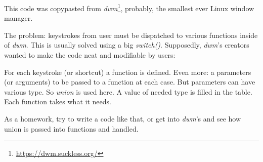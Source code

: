 
This code was copypasted from \emph{dwm}\footnote{\url{https://dwm.suckless.org/}}, probably, the smallest ever Linux window manager.

The problem: keystrokes from user must be dispatched to various functions inside of \emph{dwm}.
This is usually solved using a big \emph{switch()}.
Supposedly, \emph{dwm}'s creators wanted to make the code neat and modifiable by users:



For each keystroke (or shortcut) a function is defined.
Even more: a parameters (or arguments) to be passed to a function at each case.
But parameters can have various type.
So \emph{union} is used here.
A value of needed type is filled in the table.
Each function takes what it needs.

As a homework, try to write a code like that, or get into \emph{dwm}'s and see how union is passed into functions and handled.

